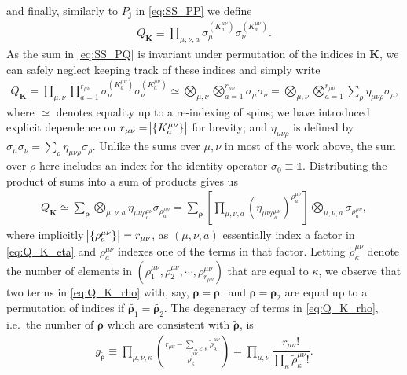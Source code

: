 \documentclass[aps,notitlepage,nofootinbib,11pt]{revtex4-1}
\newcommand{\f}[2]{\dfrac{#1}{#2}} %
\newcommand{\p}[1]{\left(#1\right)} %
\renewcommand{\sp}[1]{\left[#1\right]} %
\renewcommand{\set}[1]{\left\{#1\right\}} %
\renewcommand{\v}{\bm} %
\newcommand{\1}{\mathds{1}}
\begin{document}
and finally, similarly to $P_{\v j}$ in \eqref{eq:SS_PP} we define
\begin{align}
  Q_{\v K} \equiv \prod_{\mu,\nu,a}
  \sigma_\mu^{(K^{\mu\nu}_a)} \sigma_\nu^{(K^{\mu\nu}_a)}.
\end{align}
As the sum in \eqref{eq:SS_PQ} is invariant under permutation of the
indices in $\v K$, we can safely neglect keeping track of these
indices and simply write
\begin{align}
  Q_{\v K}
  = \prod_{\mu,\nu} \prod_{a=1}^{r_{\mu\nu}}
  \sigma_\mu^{(K^{\mu\nu}_a)} \sigma_\nu^{(K^{\mu\nu}_a)}
  \simeq \bigotimes_{\mu,\nu} \bigotimes_{a=1}^{r_{\mu\nu}}
  \sigma_\mu \sigma_\nu
  = \bigotimes_{\mu,\nu} \bigotimes_{a=1}^{r_{\mu\nu}}
  \sum_\rho \eta_{\mu\nu\rho} \sigma_\rho,
  \label{eq:Q_K_eta}
\end{align}
where $\simeq$ denotes equality up to a re-indexing of spins; we have
introduced explicit dependence on
$r_{\mu\nu}=\abs{\set{K^{\mu\nu}_a}}$ for brevity; and
$\eta_{\mu\nu\rho}$ is defined by
$\sigma_\mu\sigma_\nu=\sum_\rho\eta_{\mu\nu\rho}\sigma_\rho$.  Unlike
the sums over $\mu,\nu$ in most of the work above, the sum over $\rho$
here includes an index for the identity operator $\sigma_0\equiv\1$.
Distributing the product of sums into a sum of products gives us
\begin{align}
  Q_{\v K}
  \simeq \sum_{\v\rho} \bigotimes_{\mu,\nu,a}
  \eta_{\mu\nu\rho^{\mu\nu}_a} \sigma_{\rho^{\mu\nu}_a}
  = \sum_{\v\rho} \sp{\prod_{\mu,\nu,a}
    \p{\eta_{\mu\nu\rho^{\mu\nu}_a}}^{\rho^{\mu\nu}_a}}
  \bigotimes_{\mu,\nu,a} \sigma_{\rho^{\mu\nu}_a},
  \label{eq:Q_K_rho}
\end{align}
where implicitly $\abs{\set{\rho^{\mu\nu}_a}}=r_{\mu\nu}$, as
$\p{\mu,\nu,a}$ essentially index a factor in \eqref{eq:Q_K_eta} and
$\rho^{\mu\nu}_a$ indexes one of the terms in that factor.  Letting
$\tilde\rho^{\mu\nu}_\kappa$ denote the number of elements in
$\p{\rho^{\mu\nu}_1,\rho^{\mu\nu}_2,\cdots,\rho^{\mu\nu}_{r_{\mu\nu}}}$
that are equal to $\kappa$, we observe that two terms in
\eqref{eq:Q_K_rho} with, say, $\v\rho=\v\rho_1$ and $\v\rho=\v\rho_2$
are equal up to a permutation of indices if
$\tilde{\v\rho_1}=\tilde{\v\rho_2}$.  The degeneracy of terms in
\eqref{eq:Q_K_rho}, i.e.~the number of $\v\rho$ which are consistent
with $\tilde{\v\rho}$, is
\begin{align}
  g_{\tilde{\v\rho}}
  \equiv \prod_{\mu,\nu,\kappa}
  { r_{\mu\nu} - \sum_{\lambda<\kappa} \tilde\rho^{\mu\nu}_\lambda
    \choose \tilde\rho^{\mu\nu}_\kappa }
  = \prod_{\mu,\nu}
  \f{r_{\mu\nu}!}{\prod_\kappa\tilde\rho^{\mu\nu}_\kappa!}.
\end{align}
\end{document}
